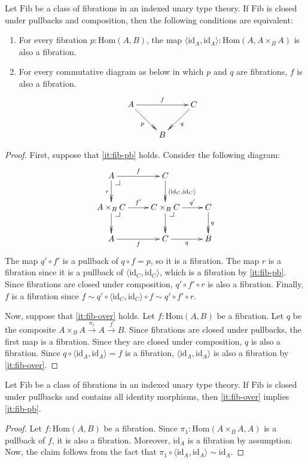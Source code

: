 \documentclass[reqno]{amsart}
\makeatletter
\theoremstyle{definition}
\theoremstyle{remark}
\newcommand{\fs}[1]{\mathrm{#1}}
\newcommand{\Hom}{\fs{Hom}}
\newcommand{\id}{\fs{id}}
\newcommand{\Fib}{\fs{Fib}}
\numberwithin{figure}{section}
\newcommand{\pb}[1][dr]{\save*!/#1-1.2pc/#1:(-1,1)@^{|-}\restore}
\makeatother
\begin{document}
\begin{prop}
Let $\Fib$ be a class of fibrations in an indexed unary type theory.
If $\Fib$ is closed under pullbacks and composition, then the following conditions are equivalent:
\begin{enumerate}
\item \label{it:fib-pb} For every fibration $p : \Hom(A,B)$, the map $\langle \id_A, \id_A \rangle : \Hom(A, A \times_B A)$ is also a fibration.
\item \label{it:fib-over} For every commutative diagram as below in which $p$ and $q$ are fibrations, $f$ is also a fibration.
\[ \xymatrix{ A \ar[rr]^f \ar@{->>}[dr]_p &   & C \ar@{->>}[dl]^q \\
                                          & B &
            }\]
\end{enumerate}
\end{prop}
\begin{proof}
First, suppose that \eqref{it:fib-pb} holds.
Consider the following diagram:
\[ \xymatrix{ A \ar[r]^f \ar@{->>}[d]_r \pb             & C \ar@{->>}[d]^{\langle \id_C, \id_C \rangle} & \\
              A \times_B C \ar[r]^{f'} \ar@{->>}[d] \pb & C \times_B C \ar[r]^-{q'} \ar@{->>}[d] \pb    & C \ar@{->>}[d]^q \\
              A \ar[r]_f                                & C \ar[r]_q                                    & B
            } \]
The map $q' \circ f'$ is a pullback of $q \circ f = p$, so it is a fibration.
The map $r$ is a fibration since it is a pullback of $\langle \id_C, \id_C \rangle$, which is a fibration by \eqref{it:fib-pb}.
Since fibrations are closed under composition, $q' \circ f' \circ r$ is also a fibration.
Finally, $f$ is a fibration since $f \sim q' \circ \langle \id_C, \id_C \rangle \circ f \sim q' \circ f' \circ r$.

Now, suppose that \eqref{it:fib-over} holds.
Let $f : \Hom(A,B)$ be a fibration.
Let $q$ be the composite $A \times_B A \xrightarrow{\pi_1} A \xrightarrow{f} B$.
Since fibrations are closed under pullbacks, the first map is a fibration.
Since they are closed under composition, $q$ is also a fibration.
Since $q \circ \langle \id_A, \id_A \rangle = f$ is a fibration, $\langle \id_A, \id_A \rangle$ is also a fibration by \eqref{it:fib-over}.
\end{proof}

\begin{lem}
Let $\Fib$ be a class of fibrations in an indexed unary type theory.
If $\Fib$ is closed under pullbacks and contains all identity morphisms, then \eqref{it:fib-over} implies \eqref{it:fib-pb}.
\end{lem}
\begin{proof}
Let $f : \Hom(A,B)$ be a fibration.
Since $\pi_1 : \Hom(A \times_B A, A)$ is a pullback of $f$, it is also a fibration.
Moreover, $\id_A$ is a fibration by assumption.
Now, the claim follows from the fact that $\pi_1 \circ \langle \id_A, \id_A \rangle \sim \id_A$.
\end{proof}
\end{document}
